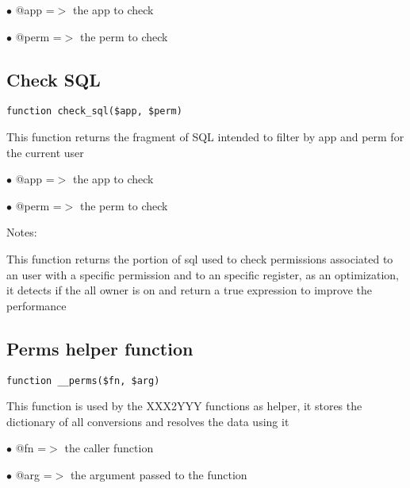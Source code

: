 \documentclass[a4paper]{book}
\begin{document}
\begin{compactitem}
\item[\color{myblue}$\bullet$] @app  =$>$ the app to check
\item[\color{myblue}$\bullet$] @perm =$>$ the perm to check
\end{compactitem}

\hypertarget{toc221}{}
\subsection{Check SQL}

\begin{lstlisting}
function check_sql($app, $perm)
\end{lstlisting}

This function returns the fragment of SQL intended to filter by app and
perm for the current user

\begin{compactitem}
\item[\color{myblue}$\bullet$] @app  =$>$ the app to check
\item[\color{myblue}$\bullet$] @perm =$>$ the perm to check
\end{compactitem}

Notes:

This function returns the portion of sql used to check permissions
associated to an user with a specific permission and to an specific
register, as an optimization, it detects if the all owner is on and
return a true expression to improve the performance

\hypertarget{toc222}{}
\subsection{Perms helper function}

\begin{lstlisting}
function __perms($fn, $arg)
\end{lstlisting}

This function is used by the XXX2YYY functions as helper, it stores the
dictionary of all conversions and resolves the data using it

\begin{compactitem}
\item[\color{myblue}$\bullet$] @fn  =$>$ the caller function
\item[\color{myblue}$\bullet$] @arg =$>$ the argument passed to the function
\end{compactitem}
\end{document}
